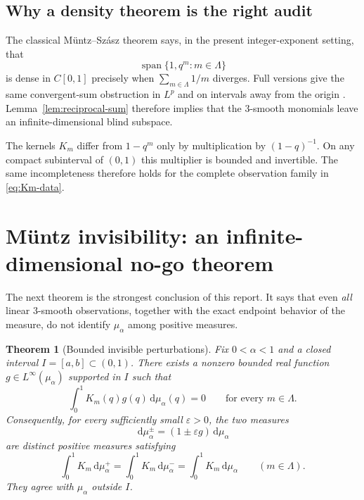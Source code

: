 \documentclass[11pt,oneside]{article}
\newtheorem{theorem}{Theorem}[section]
\theoremstyle{definition}
\theoremstyle{remark}
\newcommand{\dd}{\,\mathrm d}
\newcommand{\Span}{\operatorname{span}}
\begin{document}
\subsection{Why a density theorem is the right audit}

The classical M\"untz--Sz\'asz theorem says, in the present integer-exponent setting, that
\[
 \Span\{1,q^m:m\in\Lambda\}
\]
is dense in $C[0,1]$ precisely when $\sum_{m\in\Lambda}1/m$ diverges.  Full versions give the
same convergent-sum obstruction in $L^p$ and on intervals away from the origin
\cite{Almira2007,BorweinErdelyi1995}.  Lemma~\ref{lem:reciprocal-sum} therefore implies that
the $3$-smooth monomials leave an infinite-dimensional blind subspace.

The kernels $K_m$ differ from $1-q^m$ only by multiplication by $(1-q)^{-1}$.  On any compact
subinterval of $(0,1)$ this multiplier is bounded and invertible.  The same incompleteness
therefore holds for the complete observation family in \eqref{eq:Km-data}.

\section{M\"untz invisibility: an infinite-dimensional no-go theorem}

The next theorem is the strongest conclusion of this report.  It says that even \emph{all}
linear $3$-smooth observations, together with the exact endpoint behavior of the measure, do
not identify $\mu_\alpha$ among positive measures.

\begin{theorem}[Bounded invisible perturbations]\label{thm:muntz-invisible}
Fix $0<\alpha<1$ and a closed interval $I=[a,b]\subset(0,1)$.  There exists a nonzero bounded
real function $g\in L^\infty(\mu_\alpha)$ supported in $I$ such that
\begin{equation}\label{eq:annihilate}
 \int_0^1K_m(q)g(q)\dd\mu_\alpha(q)=0
 \qquad\text{for every }m\in\Lambda.
\end{equation}
Consequently, for every sufficiently small $\varepsilon>0$, the two measures
\begin{equation}\label{eq:mu-pm}
 \dd\mu_\alpha^\pm=(1\pm\varepsilon g)\dd\mu_\alpha
\end{equation}
are distinct positive measures satisfying
\begin{equation}\label{eq:same-data}
 \int_0^1K_m\dd\mu_\alpha^+
 =\int_0^1K_m\dd\mu_\alpha^-
 =\int_0^1K_m\dd\mu_\alpha
 \qquad(m\in\Lambda).
\end{equation}
They agree with $\mu_\alpha$ outside $I$.
\end{theorem}
\end{document}
